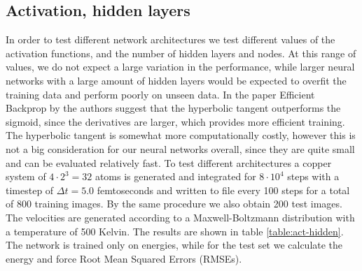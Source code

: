 \subsection{Activation, hidden layers}
In order to test different network architectures
we test different values of the activation functions, and the number
of hidden layers and nodes. 
At this range of values, we do not expect a large variation in the performance,
while larger neural networks with a large amount of hidden layers
would be expected to overfit the training data and perform
poorly on unseen data.
In the paper Efficient Backprop by \parencite[Lecun et al.]{
lecun2012efficient} the authors suggest that the hyperbolic
tangent outperforms the sigmoid, since the derivatives
are larger, which provides more efficient training.
The hyperbolic tangent is somewhat more computationally costly,
however this is not a big consideration for our neural networks
overall, since they are quite small and can be evaluated
relatively fast.
To test different architectures a copper system of $4 \cdot 2^3 = 32$
atoms is generated and integrated for $8 \cdot 10^4$ steps
with a timestep of $\Delta t = 5.0$ femtoseconds
and written to file every 100 steps for a total of 800 training images.
By the same procedure we also obtain 200 test images.
The velocities are generated
according to a Maxwell-Boltzmann distribution with a temperature
of 500 Kelvin. The results are shown in table \ref{table:act-hidden}.
The network is trained only on energies, while for the test set
we calculate the energy and force Root Mean Squared Errors (RMSEs).

